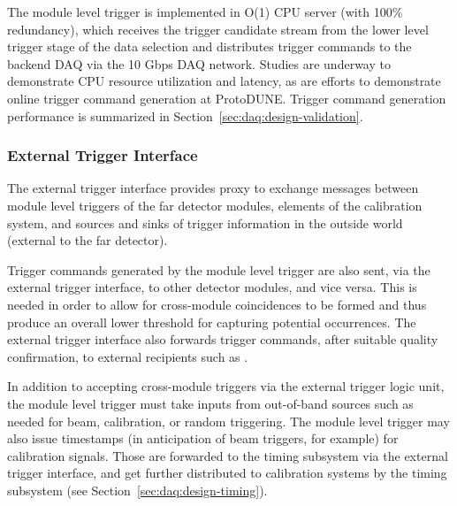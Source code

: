 The module level trigger is implemented in O(1) CPU server (with 100\%
redundancy), which receives the trigger candidate stream from the lower level
trigger stage of the data selection and distributes trigger commands to the
backend DAQ via the 10 Gbps DAQ network.
Studies are underway to demonstrate CPU resource utilization and latency, as are
efforts to demonstrate online trigger command generation at ProtoDUNE.
Trigger command generation performance is summarized in
Section~\ref{sec:daq:design-validation}.

\subsubsection{External Trigger Interface}

The external trigger interface provides proxy to exchange messages between
module level triggers of the far detector modules, elements of the calibration
system, and sources and sinks of trigger information in the outside world
(external to the far detector).

Trigger commands generated by the module level trigger are also sent, via the
external trigger interface, to other detector modules, and vice versa.
This is needed in order to allow for cross-module coincidences to be formed and
thus produce an overall lower threshold for capturing potential 
occurrences. 
The external trigger interface also forwards  trigger commands, after
suitable quality confirmation, to external recipients such as .

In addition to accepting cross-module triggers via the external trigger logic
unit, the module level trigger must take inputs from out-of-band sources such as
needed for beam, calibration, or random triggering. 
The module level trigger may also issue timestamps (in anticipation of beam
triggers, for example) for calibration signals.
Those are forwarded to the timing subsystem via the external trigger interface,
and get further distributed to calibration systems by the timing subsystem (see
Section~\ref{sec:daq:design-timing}). 

